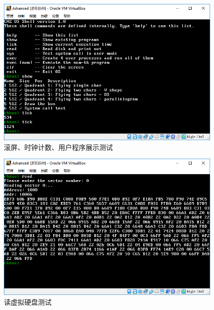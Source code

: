 \documentclass[logo,reportComp]{thesis}
\begin{document}
\begin{figure}[H]
\centering
\includegraphics[width=0.8\linewidth]{fig/show.PNG}
\caption{滚屏、时钟计数、用户程序展示测试}
\end{figure}

\begin{figure}[H]
\centering
\includegraphics[width=0.8\linewidth]{fig/read_disk.PNG}
\caption{读虚拟硬盘测试}
\end{figure}
\end{document}
